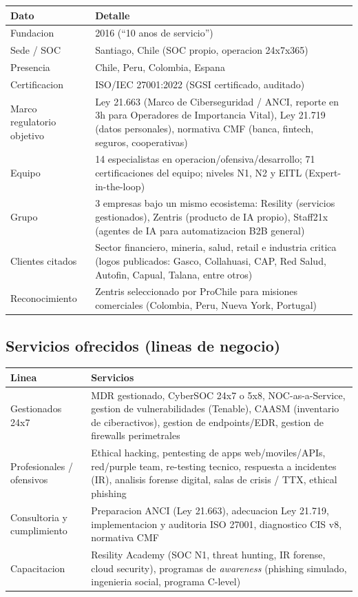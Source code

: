\documentclass[11pt,a4paper]{article}
\begin{document}
\begin{longtable}{L{4cm}L{11cm}}
\toprule
\textbf{Dato} & \textbf{Detalle} \\
\midrule
\endhead
Fundacion & 2016 (``10 anos de servicio'') \\
Sede / SOC & Santiago, Chile (SOC propio, operacion 24x7x365) \\
Presencia & Chile, Peru, Colombia, Espana \\
Certificacion & ISO/IEC 27001:2022 (SGSI certificado, auditado) \\
Marco regulatorio objetivo & Ley 21.663 (Marco de Ciberseguridad / ANCI, reporte en 3h para
Operadores de Importancia Vital), Ley 21.719 (datos personales), normativa CMF (banca, fintech,
seguros, cooperativas) \\
Equipo & 14 especialistas en operacion/ofensiva/desarrollo; 71 certificaciones del equipo;
niveles N1, N2 y EITL (Expert-in-the-loop) \\
Grupo & 3 empresas bajo un mismo ecosistema: Resility (servicios gestionados), Zentris (producto
de IA propio), Staff21x (agentes de IA para automatizacion B2B general) \\
Clientes citados & Sector financiero, mineria, salud, retail e industria critica (logos
publicados: Gasco, Collahuasi, CAP, Red Salud, Autofin, Capual, Talana, entre otros) \\
Reconocimiento & Zentris seleccionado por ProChile para misiones comerciales (Colombia, Peru,
Nueva York, Portugal) \\
\bottomrule
\end{longtable}

\subsection{Servicios ofrecidos (lineas de negocio)}

\begin{longtable}{L{4cm}L{11cm}}
\toprule
\textbf{Linea} & \textbf{Servicios} \\
\midrule
\endhead
Gestionados 24x7 & MDR gestionado, CyberSOC 24x7 o 5x8, NOC-as-a-Service, gestion de
vulnerabilidades (Tenable), CAASM (inventario de ciberactivos), gestion de endpoints/EDR,
gestion de firewalls perimetrales \\
Profesionales / ofensivos & Ethical hacking, pentesting de apps web/moviles/APIs, red/purple
team, re-testing tecnico, respuesta a incidentes (IR), analisis forense digital, salas de crisis
/ TTX, ethical phishing \\
Consultoria y cumplimiento & Preparacion ANCI (Ley 21.663), adecuacion Ley 21.719, implementacion
y auditoria ISO 27001, diagnostico CIS v8, normativa CMF \\
Capacitacion & Resility Academy (SOC N1, threat hunting, IR forense, cloud security), programas
de \emph{awareness} (phishing simulado, ingenieria social, programa C-level) \\
\bottomrule
\end{longtable}
\end{document}
